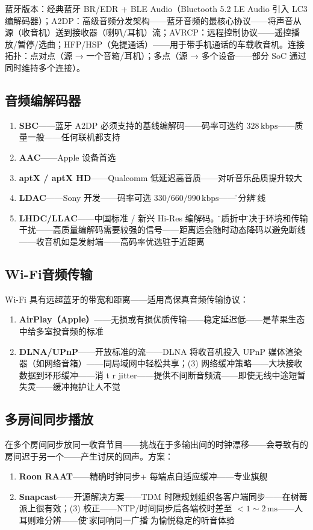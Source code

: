 \documentclass[12pt,UTF8]{ctexbook}
\begin{document}
蓝牙版本：经典蓝牙 BR/EDR + BLE Audio（Bluetooth 5.2 LE Audio 引入 LC3 编解码器）；A2DP：高级音频分发架构——蓝牙音频的最核心协议——将声音从源（收音机）送到接收器（喇叭/耳机）流；AVRCP：远程控制协议——遥控播放/暂停/选曲；HFP/HSP（免提通话）——用于带手机通话的车载收音机。连接拓扑：点对点（源 → 一个音箱/耳机）；多点（源 → 多个设备——部分 SoC 通过同时维持多个连接）。

\subsection{音频编解码器}


\begin{enumerate}
\item \textbf{SBC}——蓝牙 A2DP 必须支持的基线编解码——码率可选约 $328\,\mathrm{kbps}$——质量一般——任何联机都支持
\item \textbf{AAC}——Apple 设备首选
\item \textbf{aptX / aptX HD}——Qualcomm 低延迟高音质——对听音乐品质提升较大
\item \textbf{LDAC}——Sony 开发——码率可选 $330/660/990\,\mathrm{kbps}$——\"高分辨\"无线
\item \textbf{LHDC/LLAC}——中国标准 / 新兴 Hi-Res 编解码。\"音质折中\"取决于环境和传输干扰——高质量编解码需要较强的信号——距离远会随时动态降码以避免断线——收音机如是发射端——高码率优选驻于近距离
\end{enumerate}

\subsection{Wi-Fi音频传输}

Wi-Fi 具有远超蓝牙的带宽和距离——适用高保真音频传输协议：
\begin{enumerate}
\item \textbf{AirPlay（Apple）}——无损或有损优质传输——稳定延迟低——是苹果生态中给多室投音频的标准
\item \textbf{DLNA/UPnP}——开放标准的流——DLNA 将收音机投入 UPnP 媒体渲染器（如网络音箱）——同局域网中轻松共享；(3) 网络缓冲策略——大块接收数据到环形缓冲——消 t r  jitter——提供不间断音频流——即使无线中途短暂失灵——缓冲掩护让人不觉
\end{enumerate}

\subsection{多房间同步播放}

在多个房间同步放同一收音节目——挑战在于多输出间的时钟漂移——会导致有的房间迟于另一个——产生讨厌的回声。方案：
\begin{enumerate}
\item \textbf{Roon RAAT}——精确时钟同步+ 每端点自适应缓冲——专业旗舰
\item \textbf{Snapcast}——开源解决方案——TDM 时隙规划组织各客户端同步——在树莓派上很有效；(3) 校正——NTP/时间同步后各端校时差至 $<1\sim2\,\mathrm{ms}$——人耳则难分辨——使\"全家同响同一广播\"成为愉悦稳定的听音体验
\end{enumerate}
\end{document}

